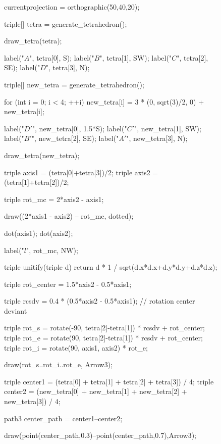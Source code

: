 \documentclass[../gatm_answers.tex]{subfiles}
\begin{document}
\begin{figure}[h]
	\begin{center}
		\begin{minipage}[b]{\textwidth}
			\centering
			\begin{asy}[width=0.5\textwidth]
			currentprojection = orthographic(50,40,20);
			
			triple[] tetra = generate_tetrahedron();
			
			draw_tetra(tetra);
			
			label("$A$", tetra[0], S);
			label("$B$", tetra[1], SW);
			label("$C$", tetra[2], SE);
			label("$D$", tetra[3], N);
			
			triple[] new_tetra = generate_tetrahedron();
			
			for (int i = 0; i < 4; ++i) new_tetra[i] = 3 * (0, sqrt(3)/2, 0) + new_tetra[i];
			
			label("$D'$", new_tetra[0], 1.5*S);
			label("$C'$", new_tetra[1], SW);
			label("$B'$", new_tetra[2], SE);
			label("$A'$", new_tetra[3], N);
			
			draw_tetra(new_tetra);
			
			triple axis1 = (tetra[0]+tetra[3])/2;
			triple axis2 = (tetra[1]+tetra[2])/2;
			
			triple rot_mc = 2*axis2 - axis1;
			
			draw((2*axis1 - axis2) -- rot_mc, dotted);
			
			dot(axis1);
			dot(axis2);
			
			label("$l$", rot_mc, NW);
			
			triple unitify(triple d) {
				return d * 1 / sqrt(d.x*d.x+d.y*d.y+d.z*d.z);
			}
			
			triple rot_center = 1.5*axis2 - 0.5*axis1;
			
			triple rcsdv = 0.4 * (0.5*axis2 - 0.5*axis1); // rotation center deviant
			
			triple rot_s = rotate(-90, tetra[2]-tetra[1]) * rcsdv + rot_center;
			triple rot_e = rotate(90, tetra[2]-tetra[1]) * rcsdv + rot_center;
			triple rot_i = rotate(90, axis1, axis2) * rot_e;
			
			draw(rot_s..rot_i..rot_e, Arrow3);
			
			
			triple center1 = (tetra[0] + tetra[1] + tetra[2] + tetra[3]) / 4;
			triple center2 = (new_tetra[0] + new_tetra[1] + new_tetra[2] + new_tetra[3]) / 4;
			
			path3 center_path = center1--center2;
			
			draw(point(center_path,0.3)--point(center_path,0.7),Arrow3);
			

\end{asy}
\end{minipage}
\end{center}
\end{figure}
\end{document}
